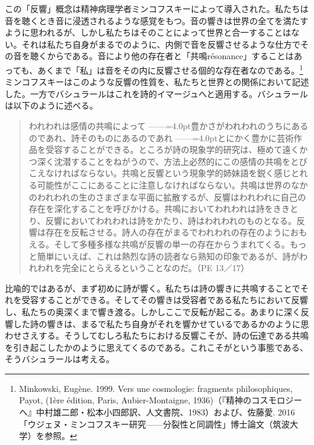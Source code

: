 \documentclass[b5j,twoside,twocolumn]{utarticle}
\begin{document}
この「反響」概念は精神病理学者ミンコフスキーによって導入された。私たちは音を聴くとき音に浸透されるような感覚をもつ。音の響きは世界の全てを満たすように思われるが、しかし私たちはそのことによって世界と合一することはない。それは私たち自身がまるでのように、内側で音を反響させるような仕方でその音を聴くからである。音により他の存在者と「共鳴résonance」することはあっても、あくまで「私」は音をその内に反響させる個的な存在者なのである。\footnote{Minkowski, Eugène. 1999. Vers une cosmologie: fragments philosophiques, Payot, (1ère édition, Paris, Aubier-Montaigne, 1936)（『精神のコスモロジーへ』中村雄二郎・松本小四郎訳、人文書院、1983）および、佐藤愛. 2016「ウジェヌ・ミンコフスキー研究------分裂性と同調性」博士論文（筑波大学）を参照。}ミンコフスキーはこのような反響の性質を、私たちと世界との関係において記述した。一方でバシュラールはこれを詩的イマージュへと適用する。バシュラールは以下のように述べる。
\begin{quote}
われわれは感情の共鳴によって\tbaselineshift =2.5pt ------\tbaselineshift =4.0pt豊かさがわれわれのうちにあるのであれ、詩そのものにあるのであれ\tbaselineshift =2.5pt ------\tbaselineshift =4.0ptとにかく豊かに芸術作品を受容することができる。ところが詩の現象学的研究は、極めて遠くかつ深く沈潜することをねがうので、方法上必然的にこの感情の共鳴をとびこえなければならない。共鳴と反響という現象学的姉妹語を鋭く感じとれる可能性がここにあることに注意しなければならない。共鳴は世界のなかのわれわれの生のさまざまな平面に拡散するが、反響はわれわれに自己の存在を深化することを呼びかける。共鳴においてわれわれは詩をききとり、反響においてわれわれは詩をかたり、詩はわれわれのものとなる。反響は存在を反転させる。詩人の存在がまるでわれわれの存在のようにおもえる。そして多種多様な共鳴が反響の単一の存在からうまれてくる。もっと簡単にいえば、これは熱烈な詩の読者なら熟知の印象であるが、詩がわれわれを完全にとらえるということなのだ。（PE 13／17）
\end{quote}

比喩的ではあるが、まず初めに詩が響く。私たちは詩の響きに共鳴することでそれを受容することができる。そしてその響きは受容者である私たちにおいて反響し、私たちの奥深くまで響き渡る。しかしここで反転が起こる。あまりに深く反響した詩の響きは、まるで私たち自身がそれを響かせているであるかのように思わせさえする。そうしてむしろ私たちにおける反響こそが、詩の伝達である共鳴を引き起こしたかのように思えてくるのである。これこそがという事態である、そうバシュラールは考える。
\end{document}
